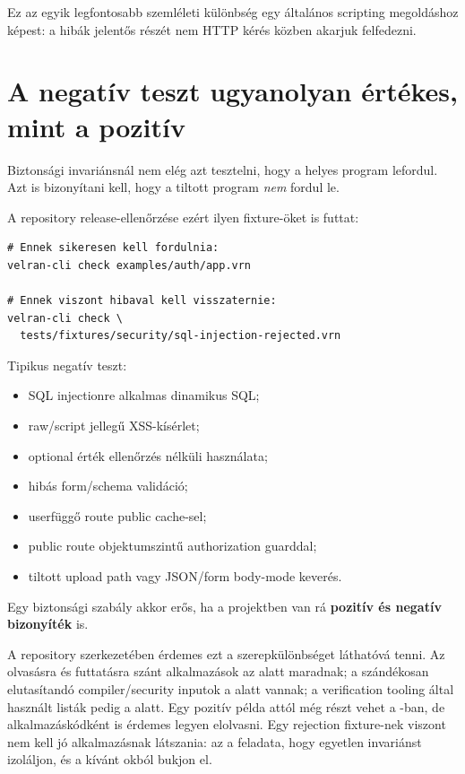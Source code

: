 Ez az egyik legfontosabb szemléleti különbség egy általános scripting megoldáshoz képest: a hibák jelentős részét nem HTTP kérés közben akarjuk felfedezni.

\section{A negatív teszt ugyanolyan értékes, mint a pozitív}

Biztonsági invariánsnál nem elég azt tesztelni, hogy a helyes program lefordul. Azt is bizonyítani kell, hogy a tiltott program \emph{nem} fordul le.

A repository release-ellenőrzése ezért ilyen fixture-öket is futtat:

\begin{lstlisting}
# Ennek sikeresen kell fordulnia:
velran-cli check examples/auth/app.vrn

# Ennek viszont hibaval kell visszaternie:
velran-cli check \
  tests/fixtures/security/sql-injection-rejected.vrn
\end{lstlisting}

Tipikus negatív teszt:

\begin{itemize}
  \item SQL injectionre alkalmas dinamikus SQL;
  \item raw/script jellegű XSS-kísérlet;
  \item optional érték ellenőrzés nélküli használata;
  \item hibás form/schema validáció;
  \item userfüggő route public cache-sel;
  \item public route objektumszintű authorization guarddal;
  \item tiltott upload path vagy JSON/form body-mode keverés.
\end{itemize}

Egy biztonsági szabály akkor erős, ha a projektben van rá \textbf{pozitív és negatív bizonyíték} is.

A repository szerkezetében érdemes ezt a szerepkülönbséget láthatóvá tenni. Az olvasásra és futtatásra szánt alkalmazások az  alatt maradnak; a szándékosan elutasítandó compiler/security inputok a  alatt vannak; a verification tooling által használt listák pedig a  alatt. Egy pozitív példa attól még részt vehet a -ban, de alkalmazáskódként is érdemes legyen elolvasni. Egy rejection fixture-nek viszont nem kell jó alkalmazásnak látszania: az a feladata, hogy egyetlen invariánst izoláljon, és a kívánt okból bukjon el.

